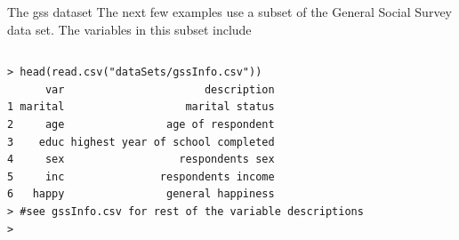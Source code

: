 \documentclass[table,smaller]{beamer}
\begin{document}
\begin{frame}[fragile,label=sec-4-1]{The gss dataset}
 The next few examples use a subset of the General Social Survey data set. The variables in this subset include
\vspace{-.5em}
\begin{columns}
\begin{block}{}
\begin{verbatim}
> head(read.csv("dataSets/gssInfo.csv")) 
      var                      description
1 marital                   marital status
2     age                age of respondent
3    educ highest year of school completed
4     sex                  respondents sex
5     inc               respondents income
6   happy                general happiness
> #see gssInfo.csv for rest of the variable descriptions
>
\end{verbatim}
\end{block}
\end{columns}
\vspace{.5em}
\end{frame}
\end{document}
